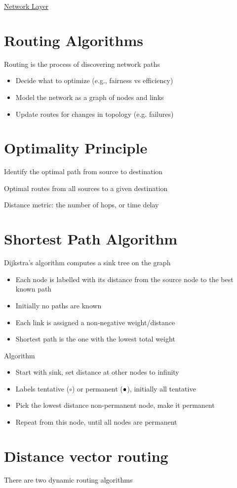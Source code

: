 \documentclass{article}[18pt]
\newcommand\filledcirc{{\color{black}\bullet}\mathllap{\circ}}
\begin{document}
\begin{center}
\underline{\huge Network Layer}
\end{center}
\section{Routing Algorithms}
Routing is the process of discovering network paths
\begin{itemize}
	\item Decide what to optimize (e.g., fairness vs efficiency)
	\item Model the network as a graph of nodes and links
	\item Update routes for changes in topology (e.g. failures)
\end{itemize}
\section{Optimality Principle}
Identify the optimal path from source to destination
\begin{defin}
Optimal routes from all sources to a given destination
\end{defin}
Distance metric: the number of hops, or time delay
\section{Shortest Path Algorithm}
Dijkstra's algorithm computes a sink tree on the graph
\begin{itemize}
	\item Each node is labelled with its distance from the source node to the best known path
	\item Initially no paths are known
	\item Each link is assigned a non-negative weight/distance
	\item Shortest path is the one with the lowest total weight
\end{itemize}
Algorithm
\begin{itemize}
	\item Start with sink, set distance at other nodes to infinity
	\item Labels tentative ($\circ$) or permanent ($\filledcirc$), initially all tentative
	\item Pick the lowest distance non-permanent node, make it permanent
	\item Repeat from this node, until all nodes are permanent
\end{itemize}
\section{Distance vector routing}
There are two dynamic routing algorithms
\end{document}
